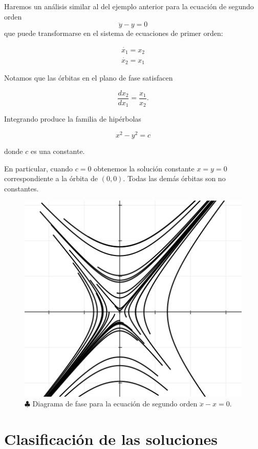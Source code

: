 \begin{example}
Haremos un análisis similar al del ejemplo anterior para la ecuación de segundo orden $$ \ddot{y} - y = 0$$ que puede transformarse en el sistema de ecuaciones de primer orden:

$$
\begin{array}{l}
	\dot{x_1} = x_2 \\
	\dot{x_2} = x_1
\end{array}
$$

Notamos que las órbitas en el plano de fase satisfacen

$$ \dfrac{dx_2}{dx_1} = \frac{x_1}{x_2}. $$

Integrando produce la familia de hipérbolas

$$ x^2 - y^2 = c $$

donde $c$ es una constante.

En particular, cuando $c = 0$ obtenemos la solución constante $x = y = 0$ correspondiente a la órbita de $(0,0)$. Todas las demás órbitas son no constantes.

\begin{figure}[!ht] \centering
	\includegraphics[scale=0.5]{figures/linearsystem-hyperbolas.png}
	\caption{$\clubsuit$ Diagrama de fase para la ecuación de segundo orden $\ddot{x} - x = 0$.}
\end{figure}

\end{example}

\section{Clasificación de las soluciones}

